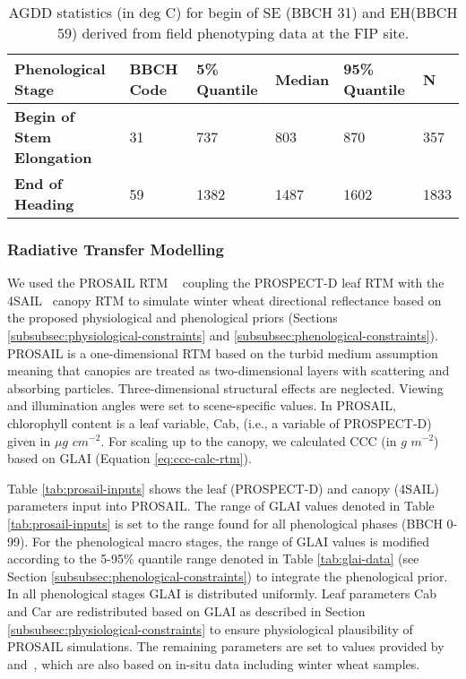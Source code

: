\begin{table}[H]
\caption{AGDD statistics (in deg C) for begin of SE (BBCH 31) and EH(BBCH 59) derived from field phenotyping data at the FIP site.}
\label{tab:bbch-agdd}
\begin{tabularx}{\textwidth}{p{5cm}p{1.5cm}p{1.8cm}p{1.8cm}p{1.8cm}p{0.8cm}}
\toprule
\textbf{Phenological Stage}       & \textbf{BBCH Code}  & \textbf{5\% Quantile} & \textbf{Median} & \textbf{95\% Quantile} & \textbf{N} \\ \midrule
\textbf{Begin of Stem Elongation} & 31            &  737    & 803        & 870  & 357        \\
\textbf{End of Heading}           & 59            & 1382    & 1487       & 1602   & 1833      \\ \bottomrule
\end{tabularx}
\end{table}


\subsubsection{Radiative Transfer Modelling}
We used the PROSAIL RTM ~\citep{jacquemoud_prospectsail_2009} coupling the PROSPECT-D leaf RTM \citep{feret_prospect-d_2017} with the 4SAIL~\citep{verhoef_light_1984} canopy RTM to simulate winter wheat directional reflectance based on the proposed physiological and phenological priors (Sections \ref{subsubsec:physiological-constraints} and \ref{subsubsec:phenological-constraints}). PROSAIL is a one-dimensional RTM based on the turbid medium assumption meaning that canopies are treated as two-dimensional layers with scattering and absorbing particles. Three-dimensional structural effects are neglected. Viewing and illumination angles were set to scene-specific values. In PROSAIL, chlorophyll content is a leaf variable, Cab, (i.e., a variable of PROSPECT-D) given in $\mu g$ $cm^{-2}$. For scaling up to the canopy, we calculated CCC (in $g$ $m^{-2}$) based on GLAI (Equation \ref{eq:ccc-calc-rtm}).

Table \ref{tab:prosail-inputs} shows the leaf (PROSPECT-D) and canopy (4SAIL) parameters input into PROSAIL. The range of GLAI values denoted in Table \ref{tab:prosail-inputs} is set to the range found for all phenological phases (BBCH 0-99). For the phenological macro stages, the range of GLAI values is modified according to the 5-95\% quantile range denoted in Table \ref{tab:glai-data} (see Section \ref{subsubsec:phenological-constraints}) to integrate the phenological prior. In all phenological stages GLAI is distributed uniformly. Leaf parameters Cab and Car are redistributed based on GLAI as described in Section \ref{subsubsec:physiological-constraints} to ensure physiological plausibility of PROSAIL simulations. The remaining parameters are set to values provided by~\cite{wocher_rtm-based_2020} and~\cite{danner_efficient_2021}, which are also based on in-situ data including winter wheat samples.

